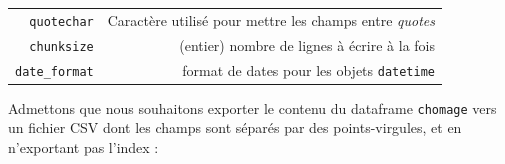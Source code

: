 \documentclass[12pt,]{book}
\numberwithin{equation}{section}
\numberwithin{countremarque}{section}
\begin{document}
\begin{longtable}[]{@{}rr@{}}
\begin{minipage}[t]{0.22\columnwidth}\raggedleft\strut
\texttt{quotechar}\strut
\end{minipage} & \begin{minipage}[t]{0.67\columnwidth}\raggedleft\strut
Caractère utilisé pour mettre les champs entre \emph{quotes}\strut
\end{minipage}\tabularnewline
\begin{minipage}[t]{0.22\columnwidth}\raggedleft\strut
\texttt{chunksize}\strut
\end{minipage} & \begin{minipage}[t]{0.67\columnwidth}\raggedleft\strut
(entier) nombre de lignes à écrire à la fois\strut
\end{minipage}\tabularnewline
\begin{minipage}[t]{0.22\columnwidth}\raggedleft\strut
\texttt{date\_format}\strut
\end{minipage} & \begin{minipage}[t]{0.67\columnwidth}\raggedleft\strut
format de dates pour les objets \texttt{datetime}\strut
\end{minipage}\tabularnewline
\bottomrule
\end{longtable}

Admettons que nous souhaitons exporter le contenu du dataframe
\texttt{chomage} vers un fichier CSV dont les champs sont séparés par
des points-virgules, et en n'exportant pas l'index :
\end{document}
